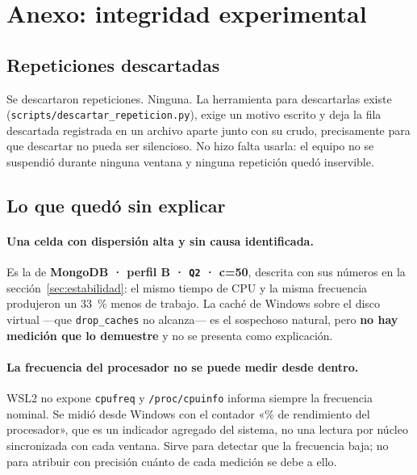
\section{Anexo: integridad experimental}
\label{sec:integridad}

\subsection{Repeticiones descartadas}

Se descartaron \textbf{\cifraDescartadas{}} repeticiones. Ninguna. La herramienta
para descartarlas existe (\texttt{scripts/descartar\_repeticion.py}), exige un
motivo escrito y deja la fila descartada registrada en un archivo aparte junto con
su crudo, precisamente para que descartar no pueda ser silencioso. No hizo falta
usarla: el equipo no se suspendió durante ninguna ventana y ninguna repetición
quedó inservible.

\subsection{Lo que quedó sin explicar}

\paragraph{Una celda con dispersión alta y sin causa identificada.}
Es la de \textbf{MongoDB · perfil B · \texttt{Q2} · \mbox{c=50}}, descrita con sus
números en la sección~\ref{sec:estabilidad}: el mismo tiempo de CPU y la misma
frecuencia produjeron un 33~\% menos de trabajo. La caché de Windows sobre el disco
virtual —que \texttt{drop\_caches} no alcanza— es el sospechoso natural, pero
\textbf{no hay medición que lo demuestre} y no se presenta como explicación.

\paragraph{La frecuencia del procesador no se puede medir desde dentro.}
WSL2 no expone \texttt{cpufreq} y \texttt{/proc/cpuinfo} informa siempre la
frecuencia nominal. Se midió desde Windows con el contador «\% de rendimiento del
procesador», que es un indicador agregado del sistema, no una lectura por núcleo
sincronizada con cada ventana. Sirve para detectar que la frecuencia baja; no para
atribuir con precisión cuánto de cada medición se debe a ello.

